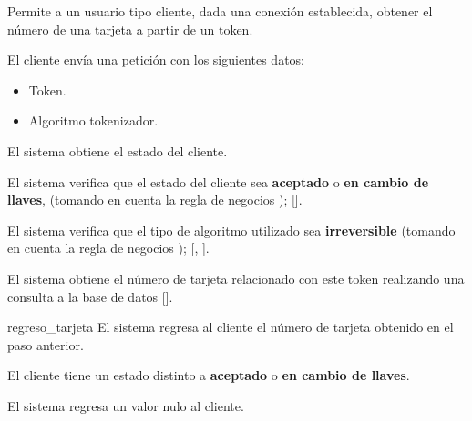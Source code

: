 %
%

{
  Permite a un usuario tipo cliente, dada una conexión establecida, obtener el
  número de una tarjeta a partir de un token.

  \begin{trayectoriaPrincipal}

    \item El cliente envía una petición con los siguientes datos:
      \begin{itemize}
        \item Token.
        \item Algoritmo tokenizador.
      \end{itemize}

    \item El sistema obtiene el estado del cliente.

    \item El sistema verifica que el estado del cliente sea \textbf{aceptado}
      o \textbf{en cambio de llaves}, (tomando en cuenta la regla de negocios
      );
      [].

    \item El sistema verifica que el tipo de algoritmo utilizado sea
      \textbf{irreversible} (tomando en cuenta la regla de negocios
      );
      [,
      ].

    \item El sistema obtiene el número de tarjeta relacionado con este token
      realizando una consulta a la base de datos
      [].

    \item [regreso_tarjeta] El sistema regresa al cliente el número de tarjeta
      obtenido en el paso anterior.

  \end{trayectoriaPrincipal}

  \begin{trayectoriaAlternativa}
    {El cliente tiene un estado distinto a \textbf{aceptado} o
      \textbf{en cambio de llaves}.}

    \item El sistema regresa un valor nulo al cliente.


\end{trayectoriaAlternativa}}
